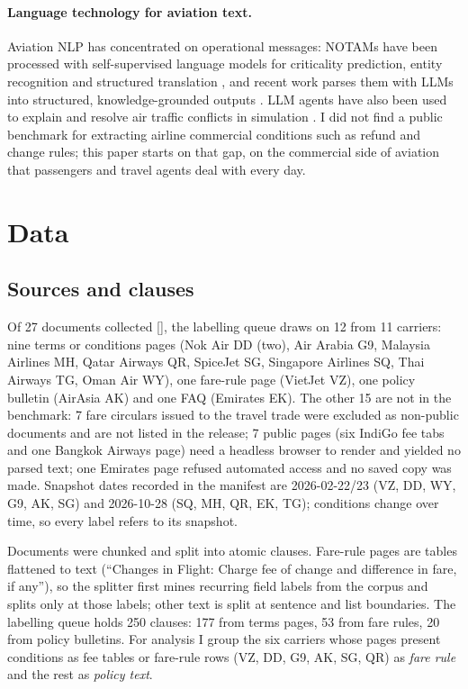 \documentclass[11pt,a4paper]{article}
\newcommand{\res}[1]{{\small[\path{#1}]}}
\begin{document}
\paragraph{Language technology for aviation text.} Aviation NLP has concentrated on operational messages: NOTAMs have been processed with self-supervised language models for criticality prediction, entity recognition and structured translation \citep{arnold2022notam}, and recent work parses them with LLMs into structured, knowledge-grounded outputs \citep{liu2025knots,liu2026notamevolve}. LLM agents have also been used to explain and resolve air traffic conflicts in simulation \citep{andriuskevicius2024atc}. I did not find a public benchmark for extracting airline commercial conditions such as refund and change rules; this paper starts on that gap, on the commercial side of aviation that passengers and travel agents deal with every day.

\section{Data}\label{sec:data}

\subsection{Sources and clauses}

Of 27 documents collected \res{data/pilot_source_manifest.csv}, the labelling queue draws on 12 from 11 carriers: nine terms or conditions pages (Nok Air DD (two), Air Arabia G9, Malaysia Airlines MH, Qatar Airways QR, SpiceJet SG, Singapore Airlines SQ, Thai Airways TG, Oman Air WY), one fare-rule page (VietJet VZ), one policy bulletin (AirAsia AK) and one FAQ (Emirates EK). The other 15 are not in the benchmark: 7 fare circulars issued to the travel trade were excluded as non-public documents and are not listed in the release; 7 public pages (six IndiGo fee tabs and one Bangkok Airways page) need a headless browser to render and yielded no parsed text; one Emirates page refused automated access and no saved copy was made. Snapshot dates recorded in the manifest are 2026-02-22/23 (VZ, DD, WY, G9, AK, SG) and 2026-10-28 (SQ, MH, QR, EK, TG); conditions change over time, so every label refers to its snapshot.

Documents were chunked and split into atomic clauses. Fare-rule pages are tables flattened to text (``Changes in Flight: Charge fee of change and difference in fare, if any''), so the splitter first mines recurring field labels from the corpus and splits only at those labels; other text is split at sentence and list boundaries. The labelling queue holds 250 clauses: 177 from terms pages, 53 from fare rules, 20 from policy bulletins. For analysis I group the six carriers whose pages present conditions as fee tables or fare-rule rows (VZ, DD, G9, AK, SG, QR) as \emph{fare rule} and the rest as \emph{policy text}.
\end{document}
